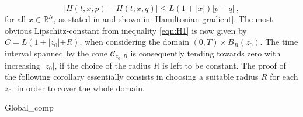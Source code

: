 		\begin{equation}
			\label{varying_Lipschitz}
			\lvert H(t, x, p) - H(t, x, q) \rvert \leq L \left(1 + \lvert x \rvert \right) \lvert p - q \rvert \ ,
		\end{equation}
		for all $ x \in \mathbb{R}^{N} $, as stated in \cite[p.~167]{zhou} and shown in \ref{Hamiltonian gradient}. The most obvious Lipschitz-constant from inequality \eqref{eqn:H1} is now given by $ C = L (1 + \lvert z_0 \lvert + R) $, when considering the domain $ \left(0, T \right) \times B_R(z_0) $. The time interval spanned by the cone $ \mathcal{C}_{z_0, R} $ is consequently tending towards zero with increasing $ \lvert z_0 \rvert $, if the choice of the radius $ R $ is left to be constant. The proof of the following corollary essentially consists in choosing a suitable radius $ R $ for each $ z_0 $, in order to cover the whole domain.
		
		{Global_comp}
		
